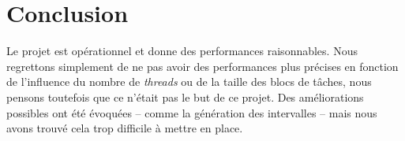 \section*{Conclusion} %
\label{sec:conclusion}

Le projet est opérationnel et donne des performances raisonnables. Nous regrettons simplement de ne pas avoir des performances plus précises en fonction de l'influence du nombre de \emph{threads} ou de la taille des blocs de tâches, nous pensons toutefois que ce n'était pas le but de ce projet. Des améliorations possibles ont été évoquées -- comme la génération des intervalles -- mais nous avons trouvé cela trop difficile à mettre en place.
